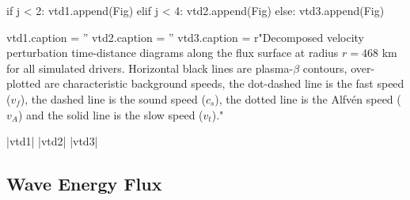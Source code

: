 \begin{pycode}[chapter4]
    if j < 2:
        vtd1.append(Fig)
    elif j < 4:
        vtd2.append(Fig)
    else:
        vtd3.append(Fig)

vtd1.caption = ''
vtd2.caption = ''
vtd3.caption = r"Decomposed velocity perturbation time-distance diagrams along the flux surface at radius $r = 468$ km for all simulated drivers. Horizontal black lines are plasma-$\beta$ contours, over-plotted are characteristic background speeds, the dot-dashed line is the fast speed ($v_f$), the dashed line is the sound speed ($c_s$), the dotted line is the Alfv\'en speed ($v_A$) and the solid line is the slow speed ($v_t$)."

\end{pycode}


\py[chapter4]|vtd1|
\py[chapter4]|vtd2|
\py[chapter4]|vtd3|


\subsection{Wave Energy Flux}\label{sec:energy_flux}

